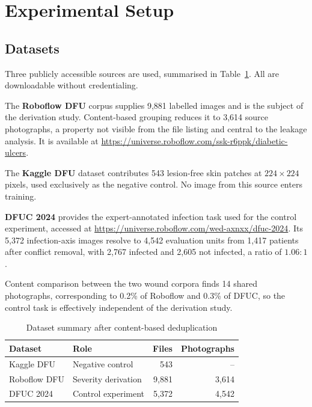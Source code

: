 \section{Experimental Setup}

\subsection{Datasets}

Three publicly accessible sources are used, summarised in
Table~\ref{tab:datasets}. All are downloadable without credentialing.

The \textbf{Roboflow DFU} corpus \cite{roboflow_dfu} supplies 9{,}881 labelled images and is
the subject of the derivation study. Content-based grouping reduces it to
3{,}614 source photographs, a property not visible from the file listing
and central to the leakage analysis. It is available at
\url{https://universe.roboflow.com/ssk-r6ppk/diabetic-ulcers}.

The \textbf{Kaggle DFU} dataset \cite{alzubaidi2020} contributes 543
lesion-free skin patches at $224 \times 224$ pixels, used exclusively as
the negative control. No image from this source enters training.

\textbf{DFUC 2024} \cite{dfuc2024} provides the expert-annotated infection task used for
the control experiment, accessed at
\url{https://universe.roboflow.com/wed-axnxx/dfuc-2024}. Its 5{,}372
infection-axis images resolve to 4{,}542 evaluation units from 1{,}417
patients after conflict removal, with 2{,}767 infected and 2{,}605 not
infected, a ratio of $1.06:1$.

Content comparison between the two wound corpora finds 14 shared
photographs, corresponding to 0.2\% of Roboflow and 0.3\% of DFUC, so the
control task is effectively independent of the derivation study.

\begin{table}[!t]
\caption{Dataset summary after content-based deduplication}
\label{tab:datasets}
\centering
\small
\begin{tabular}{@{}llrr@{}}
\toprule
Dataset & Role & Files & Photographs \\
\midrule
Kaggle DFU   & Negative control    & 543      & --      \\
Roboflow DFU & Severity derivation & 9{,}881  & 3{,}614 \\
DFUC 2024    & Control experiment  & 5{,}372  & 4{,}542 \\
\bottomrule
\end{tabular}
\end{table}

